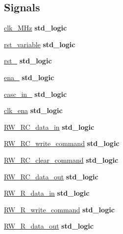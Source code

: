 \subsection*{Signals}
 \begin{DoxyCompactItemize}
\item 
\hyperlink{classtb__flip__flop_1_1behavior_aa754743a6b1100cdc70b2fa0e77bbc12}{clk\+\_\+M\+Hz} {\bfseries \textcolor{vhdlchar}{std\+\_\+logic}\textcolor{vhdlchar}{ }} 
\item 
\hyperlink{classtb__flip__flop_1_1behavior_ae54dd7074d45e37f77b1b1f40f177769}{rst\+\_\+variable} {\bfseries \textcolor{vhdlchar}{std\+\_\+logic}\textcolor{vhdlchar}{ }} 
\item 
\hyperlink{classtb__flip__flop_1_1behavior_a51c8392febe2f54bfc0e599a761cd7ef}{rst\+\_} {\bfseries \textcolor{vhdlchar}{std\+\_\+logic}\textcolor{vhdlchar}{ }} 
\item 
\hyperlink{classtb__flip__flop_1_1behavior_ac6071972616da6d9113dc4dae108544a}{ena\+\_} {\bfseries \textcolor{vhdlchar}{std\+\_\+logic}\textcolor{vhdlchar}{ }} 
\item 
\hyperlink{classtb__flip__flop_1_1behavior_aaed2f21c33b2ae2013e88e57ddb091d9}{casc\+\_\+in\+\_} {\bfseries \textcolor{vhdlchar}{std\+\_\+logic}\textcolor{vhdlchar}{ }} 
\item 
\hyperlink{classtb__flip__flop_1_1behavior_ad2068163a678090a907c39fc195ed473}{clk\+\_\+ena} {\bfseries \textcolor{vhdlchar}{std\+\_\+logic}\textcolor{vhdlchar}{ }} 
\item 
\hyperlink{classtb__flip__flop_1_1behavior_a85fd49b037d88a8987b4cb9ed23a722c}{R\+W\+\_\+\+R\+C\+\_\+data\+\_\+in} {\bfseries \textcolor{vhdlchar}{std\+\_\+logic}\textcolor{vhdlchar}{ }} 
\item 
\hyperlink{classtb__flip__flop_1_1behavior_a6542f766c26e9bbf9172760115f6ea9c}{R\+W\+\_\+\+R\+C\+\_\+write\+\_\+command} {\bfseries \textcolor{vhdlchar}{std\+\_\+logic}\textcolor{vhdlchar}{ }} 
\item 
\hyperlink{classtb__flip__flop_1_1behavior_a998c4ad24abc3e8df68069acfdc26fb9}{R\+W\+\_\+\+R\+C\+\_\+clear\+\_\+command} {\bfseries \textcolor{vhdlchar}{std\+\_\+logic}\textcolor{vhdlchar}{ }} 
\item 
\hyperlink{classtb__flip__flop_1_1behavior_ae07aef622ce63f91f4c3a1fb44ec0327}{R\+W\+\_\+\+R\+C\+\_\+data\+\_\+out} {\bfseries \textcolor{vhdlchar}{std\+\_\+logic}\textcolor{vhdlchar}{ }} 
\item 
\hyperlink{classtb__flip__flop_1_1behavior_a8ead7e1c37144927f3fc66eca822d986}{R\+W\+\_\+\+R\+\_\+data\+\_\+in} {\bfseries \textcolor{vhdlchar}{std\+\_\+logic}\textcolor{vhdlchar}{ }} 
\item 
\hyperlink{classtb__flip__flop_1_1behavior_a50a5ed698e443d70e64669d06d8f980d}{R\+W\+\_\+\+R\+\_\+write\+\_\+command} {\bfseries \textcolor{vhdlchar}{std\+\_\+logic}\textcolor{vhdlchar}{ }} 
\item 
\hyperlink{classtb__flip__flop_1_1behavior_a9c3d821aa282e1d82833303db507decd}{R\+W\+\_\+\+R\+\_\+data\+\_\+out} {\bfseries \textcolor{vhdlchar}{std\+\_\+logic}\textcolor{vhdlchar}{ }} 
\end{DoxyCompactItemize}
